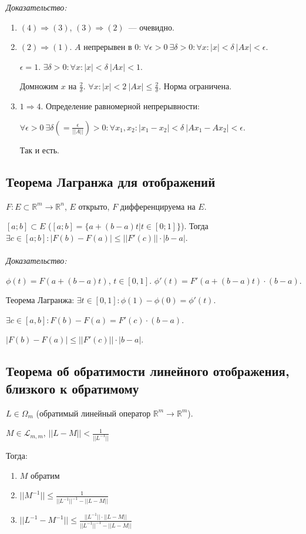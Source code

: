 \documentclass[paper=a4, fontsize=11pt]{article}
\begin{document}
\emph{Доказательство:}
\begin{enumerate}
    \item $(4) \Rightarrow (3)$, $(3) \Rightarrow (2)$~--- очевидно.
    \item $(2) \Rightarrow (1)$. $A$ непрерывен в $0$:
    $\forall \epsilon > 0\ \exists \delta > 0: \forall x: |x|<\delta\ |Ax| < \epsilon$.

    $\epsilon = 1$. $\exists \delta > 0: \forall x: |x|<\delta\ |Ax| < 1$.

    Домножим $x$ на $\frac{2}{\delta}$. $\forall x:|x| < 2\ |Ax| \leq \frac{2}{\delta}$.
    Норма ограничена.
    \item $1 \Rightarrow 4$. Определение равномерной непрерывности:
    
    $\forall \epsilon > 0\ \exists \delta (=\frac{\epsilon}{||A||}) > 0: \forall x_1,x_2:|x_1-x_2|<\delta\ |Ax_1-Ax_2| < \epsilon$.

    Так и есть.
\end{enumerate}

\subsection{Теорема Лагранжа для отображений}
$F: E \subset \mathds{R}^m \rightarrow \mathds{R}^n$, $E$ открыто, $F$ дифференцируема на $E$.

$[a;b] \subset E$ ($[a;b] = \{a+(b-a)t|t \in [0;1]\}$). Тогда $\exists c \in [a;b]: |F(b)-F(a)| \leq ||F'(c)|| \cdot |b-a|$.
\\\\
\emph{Доказательство:}

$\phi(t) = F(a + (b-a)t)$, $t \in [0,1]$. $\phi'(t) = F'(a+(b-a)t)\cdot(b-a)$.

Теорема Лагранжа: $\exists t \in [0,1]: \phi(1)-\phi(0) = \phi'(t)$.

$\exists c \in [a,b]: F(b)-F(a) = F'(c) \cdot (b-a)$.

$|F(b) - F(a)| \leq ||F'(c)|| \cdot |b-a|$.

\subsection{Теорема об обратимости линейного отображения, близкого к обратимому}
$L \in \Omega_m$ (обратимый линейный оператор $\mathds{R}^m \rightarrow \mathds{R}^m$).

$M \in \mathscr{L}_{m,m}$, $||L-M|| < \frac{1}{||L^{-1}||}$

Тогда:
\begin{enumerate}
    \item $M$ обратим
    \item $||M^{-1}|| \leq \frac{1}{||L^{-1}||^{-1} - ||L-M||}$
    \item $||L^{-1}-M^{-1}|| \leq \frac{||L^{-1}|| \cdot ||L-M||}{||L^{-1}||^{-1} - ||L-M||}$
\end{enumerate}
\end{document}
